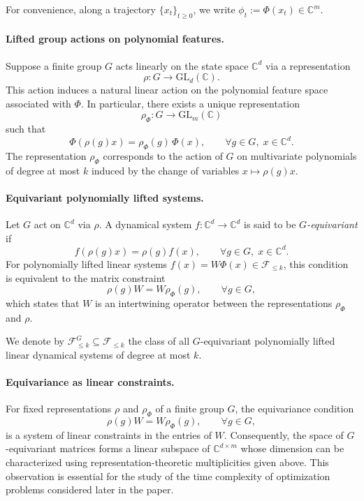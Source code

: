 \documentclass[11pt]{article}
\theoremstyle{plain}
\theoremstyle{definition}
\theoremstyle{remark}
\begin{document}
For convenience, along a trajectory $\{x_t\}_{t \ge 0}$, we write $\phi_t := \Phi(x_t) \in \mathbb{C}^m$.

\paragraph{Lifted group actions on polynomial features.}
Suppose a finite group $G$ acts linearly on the state space $\mathbb{C}^d$ via a representation
\[
\rho : G \to \mathrm{GL}_d(\mathbb{C}).
\]
This action induces a natural linear action on the polynomial feature space associated with $\Phi$. In particular, there exists a unique representation
\[
\rho_\Phi : G \to \mathrm{GL}_m(\mathbb{C})
\]
such that
\begin{equation}
\Phi(\rho(g)x) = \rho_\Phi(g)\,\Phi(x),
\qquad \forall g \in G,\; x \in \mathbb{C}^d.
\label{eq:lifted_action}
\end{equation}
The representation $\rho_\Phi$ corresponds to the action of $G$ on multivariate polynomials of degree at most $k$ induced by the change of variables $x \mapsto \rho(g)x$.

\paragraph{Equivariant polynomially lifted systems.}
Let $G$ act on $\mathbb{C}^d$ via $\rho$. A dynamical system
$f : \mathbb{C}^d \to \mathbb{C}^d$
is said to be \emph{$G$-equivariant} if
\[
f(\rho(g)x) = \rho(g) f(x),
\qquad \forall g \in G,\; x \in \mathbb{C}^d.
\]
For polynomially lifted linear systems $f(x) = W \Phi(x) \in \mathcal{F}_{\le k}$, this condition is equivalent to the matrix constraint
\begin{equation}
\rho(g) W = W \rho_\Phi(g),
\qquad \forall g \in G,
\label{eq:equivariance_constraint}
\end{equation}
which states that $W$ is an intertwining operator between the representations $\rho_\Phi$ and $\rho$.

We denote by $\mathcal{F}_{\le k}^G \subseteq \mathcal{F}_{\le k}$ the class of all $G$-equivariant polynomially lifted linear dynamical systems of degree at most $k$.



\paragraph{Equivariance as linear constraints.}
For fixed representations $\rho$ and $\rho_\Phi$ of a finite group $G$, the equivariance condition
\[
\rho(g) W = W \rho_\Phi(g), \qquad \forall g \in G,
\]
is a system of linear constraints in the entries of $W$. Consequently, the space of $G$-equivariant matrices forms a linear subspace of $\mathbb{C}^{d \times m}$ whose dimension can be characterized using representation-theoretic multiplicities given above. This observation is essential for the study of the time complexity of optimization problems considered later in the paper. 
\end{document}
